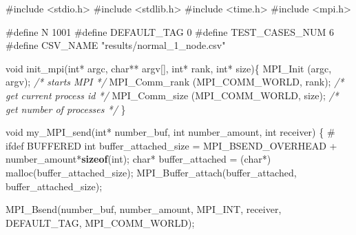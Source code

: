 \documentclass[11pt]{article}
\newenvironment{Shaded}{}{}
\newcommand{\KeywordTok}[1]{\textcolor[rgb]{0.00,0.44,0.13}{\textbf{{#1}}}}
\newcommand{\DataTypeTok}[1]{\textcolor[rgb]{0.56,0.13,0.00}{{#1}}}
\newcommand{\CommentTok}[1]{\textcolor[rgb]{0.38,0.63,0.69}{\textit{{#1}}}}
\newcommand{\NormalTok}[1]{{#1}}
\newcommand{\ImportTok}[1]{{#1}}
\newcommand{\OperatorTok}[1]{\textcolor[rgb]{0.40,0.40,0.40}{{#1}}}
\newcommand{\PreprocessorTok}[1]{\textcolor[rgb]{0.74,0.48,0.00}{{#1}}}
\begin{document}
\begin{Shaded}
\begin{Highlighting}[]
\PreprocessorTok{\#include }\ImportTok{\textless{}stdio.h\textgreater{}}
\PreprocessorTok{\#include }\ImportTok{\textless{}stdlib.h\textgreater{}}
\PreprocessorTok{\#include }\ImportTok{\textless{}time.h\textgreater{}}
\PreprocessorTok{\#include }\ImportTok{\textless{}mpi.h\textgreater{}}

\PreprocessorTok{\#define N 1001}
\PreprocessorTok{\#define DEFAULT\_TAG 0}
\PreprocessorTok{\#define TEST\_CASES\_NUM 6}
\PreprocessorTok{\#define CSV\_NAME "results/normal\_1\_node.csv"}

\DataTypeTok{void}\NormalTok{ init\_mpi}\OperatorTok{(}\DataTypeTok{int}\OperatorTok{*}\NormalTok{ argc}\OperatorTok{,} \DataTypeTok{char}\OperatorTok{**}\NormalTok{ argv}\OperatorTok{[],} \DataTypeTok{int}\OperatorTok{*}\NormalTok{ rank}\OperatorTok{,} \DataTypeTok{int}\OperatorTok{*}\NormalTok{ size}\OperatorTok{)\{}
\NormalTok{   MPI\_Init }\OperatorTok{(}\NormalTok{argc}\OperatorTok{,}\NormalTok{ argv}\OperatorTok{);}  \CommentTok{/* starts MPI */}
\NormalTok{  MPI\_Comm\_rank }\OperatorTok{(}\NormalTok{MPI\_COMM\_WORLD}\OperatorTok{,}\NormalTok{ rank}\OperatorTok{);}  \CommentTok{/* get current process id */}
\NormalTok{  MPI\_Comm\_size }\OperatorTok{(}\NormalTok{MPI\_COMM\_WORLD}\OperatorTok{,}\NormalTok{ size}\OperatorTok{);}  \CommentTok{/* get number of processes */}
\OperatorTok{\}}

\DataTypeTok{void}\NormalTok{ my\_MPI\_send}\OperatorTok{(}\DataTypeTok{int}\OperatorTok{*}\NormalTok{ number\_buf}\OperatorTok{,} \DataTypeTok{int}\NormalTok{ number\_amount}\OperatorTok{,} \DataTypeTok{int}\NormalTok{ receiver}\OperatorTok{)} \OperatorTok{\{}
  \PreprocessorTok{\# ifdef BUFFERED}
        \DataTypeTok{int}\NormalTok{ buffer\_attached\_size }\OperatorTok{=}\NormalTok{ MPI\_BSEND\_OVERHEAD }\OperatorTok{+}\NormalTok{  number\_amount}\OperatorTok{*}\KeywordTok{sizeof}\OperatorTok{(}\DataTypeTok{int}\OperatorTok{);}
        \DataTypeTok{char}\OperatorTok{*}\NormalTok{ buffer\_attached }\OperatorTok{=} \OperatorTok{(}\DataTypeTok{char}\OperatorTok{*)}\NormalTok{ malloc}\OperatorTok{(}\NormalTok{buffer\_attached\_size}\OperatorTok{);}
\NormalTok{        MPI\_Buffer\_attach}\OperatorTok{(}\NormalTok{buffer\_attached}\OperatorTok{,}\NormalTok{ buffer\_attached\_size}\OperatorTok{);}

\NormalTok{        MPI\_Bsend}\OperatorTok{(}\NormalTok{number\_buf}\OperatorTok{,}\NormalTok{ number\_amount}\OperatorTok{,}\NormalTok{ MPI\_INT}\OperatorTok{,}\NormalTok{ receiver}\OperatorTok{,}\NormalTok{ DEFAULT\_TAG}\OperatorTok{,}\NormalTok{ MPI\_COMM\_WORLD}\OperatorTok{);}
        

\end{Highlighting}
\end{Shaded}
\end{document}
